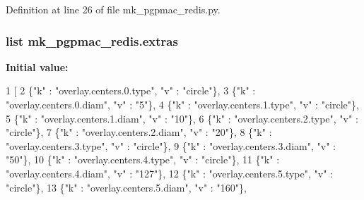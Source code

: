 Definition at line 26 of file mk\-\_\-pgpmac\-\_\-redis.\-py.

\hypertarget{namespacemk__pgpmac__redis_a3c74008dcad02dee86570e9a0c498a14}{
\subsubsection[{extras}]{\setlength{\rightskip}{0pt plus 5cm}list mk\-\_\-pgpmac\-\_\-redis.\-extras}}\label{namespacemk__pgpmac__redis_a3c74008dcad02dee86570e9a0c498a14}
{\bfseries Initial value\-:}
\begin{DoxyCode}
1 [
2     \{\textcolor{stringliteral}{"k"} : \textcolor{stringliteral}{"overlay.centers.0.type"},   \textcolor{stringliteral}{"v"} : \textcolor{stringliteral}{"circle"}\},
3     \{\textcolor{stringliteral}{"k"} : \textcolor{stringliteral}{"overlay.centers.0.diam"},   \textcolor{stringliteral}{"v"} : \textcolor{stringliteral}{"5"}\},
4     \{\textcolor{stringliteral}{"k"} : \textcolor{stringliteral}{"overlay.centers.1.type"},   \textcolor{stringliteral}{"v"} : \textcolor{stringliteral}{"circle"}\},
5     \{\textcolor{stringliteral}{"k"} : \textcolor{stringliteral}{"overlay.centers.1.diam"},   \textcolor{stringliteral}{"v"} : \textcolor{stringliteral}{"10"}\},
6     \{\textcolor{stringliteral}{"k"} : \textcolor{stringliteral}{"overlay.centers.2.type"},   \textcolor{stringliteral}{"v"} : \textcolor{stringliteral}{"circle"}\},
7     \{\textcolor{stringliteral}{"k"} : \textcolor{stringliteral}{"overlay.centers.2.diam"},   \textcolor{stringliteral}{"v"} : \textcolor{stringliteral}{"20"}\},
8     \{\textcolor{stringliteral}{"k"} : \textcolor{stringliteral}{"overlay.centers.3.type"},   \textcolor{stringliteral}{"v"} : \textcolor{stringliteral}{"circle"}\},
9     \{\textcolor{stringliteral}{"k"} : \textcolor{stringliteral}{"overlay.centers.3.diam"},   \textcolor{stringliteral}{"v"} : \textcolor{stringliteral}{"50"}\},
10     \{\textcolor{stringliteral}{"k"} : \textcolor{stringliteral}{"overlay.centers.4.type"},   \textcolor{stringliteral}{"v"} : \textcolor{stringliteral}{"circle"}\},
11     \{\textcolor{stringliteral}{"k"} : \textcolor{stringliteral}{"overlay.centers.4.diam"},   \textcolor{stringliteral}{"v"} : \textcolor{stringliteral}{"127"}\},
12     \{\textcolor{stringliteral}{"k"} : \textcolor{stringliteral}{"overlay.centers.5.type"},   \textcolor{stringliteral}{"v"} : \textcolor{stringliteral}{"circle"}\},
13     \{\textcolor{stringliteral}{"k"} : \textcolor{stringliteral}{"overlay.centers.5.diam"},   \textcolor{stringliteral}{"v"} : \textcolor{stringliteral}{"160"}\},

\end{DoxyCode}
